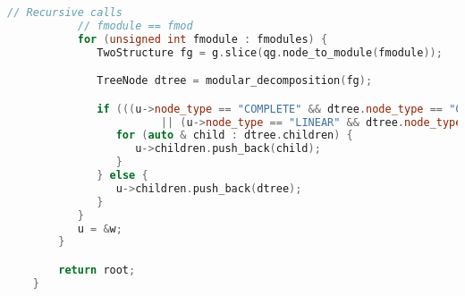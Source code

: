 \begin{lstlisting}[language=C++, style=cpp, caption={Defining the Modular Decomposition with C++}, label={lst:cpp-define-modular-decomposition}, firstnumber=1]
           // Recursive calls
           // fmodule == fmod
           for (unsigned int fmodule : fmodules) {
              TwoStructure fg = g.slice(qg.node_to_module(fmodule));

              TreeNode dtree = modular_decomposition(fg);

              if (((u->node_type == "COMPLETE" && dtree.node_type == "COMPLETE") && (u->node_colors == dtree.node_colors))
                        || (u->node_type == "LINEAR" && dtree.node_type == "LINEAR") && (u->node_colors == dtree.node_colors)) {
                 for (auto & child : dtree.children) {
                    u->children.push_back(child);
                 }
              } else {
                 u->children.push_back(dtree);
              }
           }
           u = &w;
        }

        return root;
    }
\end{lstlisting}



